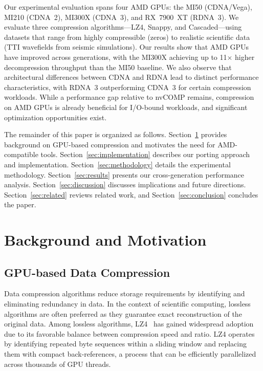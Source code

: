\documentclass[runningheads]{llncs}
\begin{document}
Our experimental evaluation spans four AMD GPUs: the MI50 (CDNA/Vega), MI210 (CDNA~2), MI300X (CDNA~3), and RX~7900~XT (RDNA~3). We evaluate three compression algorithms---LZ4, Snappy, and Cascaded---using datasets that range from highly compressible (zeros) to realistic scientific data (TTI wavefields from seismic simulations). Our results show that AMD GPUs have improved across generations, with the MI300X achieving up to 11$\times$ higher decompression throughput than the MI50 baseline. We also observe that architectural differences between CDNA and RDNA lead to distinct performance characteristics, with RDNA~3 outperforming CDNA~3 for certain compression workloads. While a performance gap relative to nvCOMP remains, compression on AMD GPUs is already beneficial for I/O-bound workloads, and significant optimization opportunities exist.

The remainder of this paper is organized as follows. Section~\ref{sec:background} provides background on GPU-based compression and motivates the need for AMD-compatible tools. Section~\ref{sec:implementation} describes our porting approach and implementation. Section~\ref{sec:methodology} details the experimental methodology. Section~\ref{sec:results} presents our cross-generation performance analysis. Section~\ref{sec:discussion} discusses implications and future directions. Section~\ref{sec:related} reviews related work, and Section~\ref{sec:conclusion} concludes the paper.


\section{Background and Motivation}
\label{sec:background}

\subsection{GPU-based Data Compression}

Data compression algorithms reduce storage requirements by identifying and eliminating redundancy in data. In the context of scientific computing, lossless algorithms are often preferred as they guarantee exact reconstruction of the original data. Among lossless algorithms, LZ4~\cite{lz4} has gained widespread adoption due to its favorable balance between compression speed and ratio. LZ4 operates by identifying repeated byte sequences within a sliding window and replacing them with compact back-references, a process that can be efficiently parallelized across thousands of GPU threads.
\end{document}
